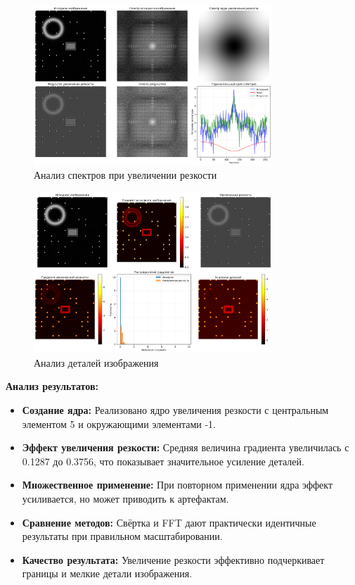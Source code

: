 \begin{figure}[H]
    \centering
    \includegraphics[width=0.8\textwidth]{images/task3/spectrum_analysis.png}
    \caption{Анализ спектров при увеличении резкости}
    \label{fig:spectrum_analysis_sharp}
\end{figure}

\begin{figure}[H]
    \centering
    \includegraphics[width=0.8\textwidth]{images/task3/detail_analysis.png}
    \caption{Анализ деталей изображения}
    \label{fig:detail_analysis_sharp}
\end{figure}

\textbf{Анализ результатов:}
\begin{itemize}
    \item \textbf{Создание ядра:} Реализовано ядро увеличения резкости с центральным элементом 5 и окружающими элементами -1.
    
    \item \textbf{Эффект увеличения резкости:} Средняя величина градиента увеличилась с 0.1287 до 0.3756, что показывает значительное усиление деталей.
    
    \item \textbf{Множественное применение:} При повторном применении ядра эффект усиливается, но может приводить к артефактам.
    
    \item \textbf{Сравнение методов:} Свёртка и FFT дают практически идентичные результаты при правильном масштабировании.
    
    \item \textbf{Качество результата:} Увеличение резкости эффективно подчеркивает границы и мелкие детали изображения.
\end{itemize}

